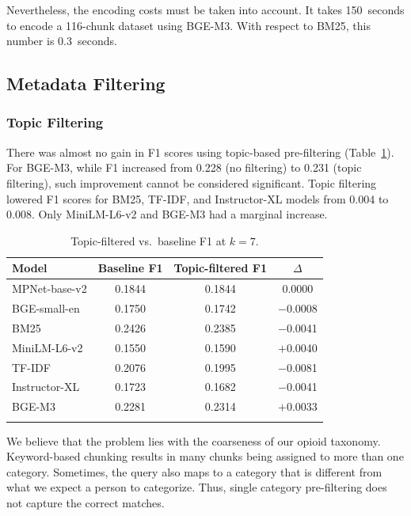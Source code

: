 \documentclass[pdflatex,sn-mathphys-num]{sn-jnl}
\theoremstyle{thmstyleone}
\theoremstyle{thmstyletwo}
\theoremstyle{thmstylethree}
\begin{document}
Nevertheless, the encoding costs must be taken into account. It takes 150~seconds to encode a 116-chunk dataset using BGE-M3. With respect to BM25, this number is 0.3~seconds.

\subsection{Metadata Filtering}

\subsubsection{Topic Filtering}

There was almost no gain in F1 scores using topic-based pre-filtering (Table~\ref{tab:topic_filter}). For BGE-M3, while F1 increased from 0.228 (no filtering) to 0.231 (topic filtering), such improvement cannot be considered significant. Topic filtering lowered F1 scores for BM25, TF-IDF, and Instructor-XL models from 0.004 to 0.008. Only MiniLM-L6-v2 and BGE-M3 had a marginal increase.

\begin{table}[h]
  \centering
  \caption{Topic-filtered vs.\ baseline F1 at $k=7$.}
  \label{tab:topic_filter}
  \begin{tabular}{@{}lccc@{}}
    \toprule
    \textbf{Model} & \textbf{Baseline F1} & \textbf{Topic-filtered F1} & $\Delta$ \\
    \midrule
    MPNet-base-v2 & 0.1844 & 0.1844 & \phantom{$-$}0.0000 \\
    BGE-small-en  & 0.1750 & 0.1742 & $-$0.0008 \\
    BM25          & 0.2426 & 0.2385 & $-$0.0041 \\
    MiniLM-L6-v2  & 0.1550 & 0.1590 & $+$0.0040 \\
    TF-IDF        & 0.2076 & 0.1995 & $-$0.0081 \\
    Instructor-XL & 0.1723 & 0.1682 & $-$0.0041 \\
    BGE-M3        & 0.2281 & 0.2314 & $+$0.0033 \\
    \botrule
  \end{tabular}
\end{table}

We believe that the problem lies with the coarseness of our opioid taxonomy. Keyword-based chunking results in many chunks being assigned to more than one category. Sometimes, the query also maps to a category that is different from what we expect a person to categorize. Thus, single category pre-filtering does not capture the correct matches.
\end{document}
